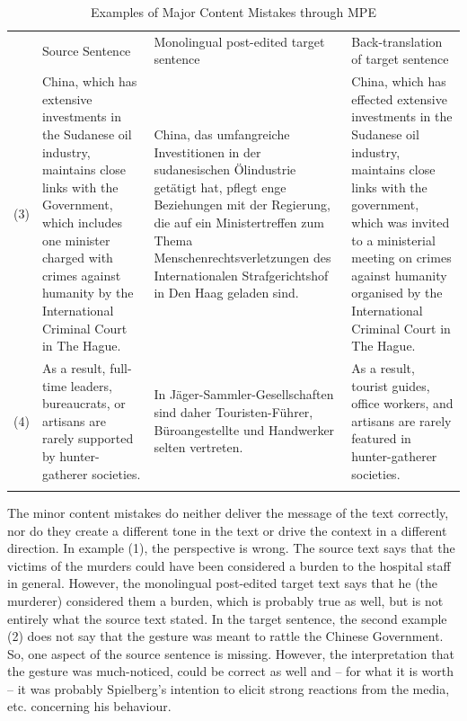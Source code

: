 \documentclass[output=paper]{langsci/langscibook}
\begin{document}
\begin{table}
\begin{tabularx}{\textwidth}{lXXX} 
    & Source Sentence & Monolingual post-edited target sentence & Back-translation of target sentence \\
\lsptoprule
(3) & China, which has extensive investments in the Sudanese oil industry, maintains close links with the Government, which includes one minister charged with crimes against humanity by the International Criminal Court in The Hague. & China, das umfangreiche Investitionen in der sudanesischen Ölindustrie getätigt hat, pflegt enge Beziehungen mit der Regierung, die auf ein Ministertreffen zum Thema Menschenrechtsverletzungen des Internationalen Strafgerichtshof in Den Haag geladen sind. & China, which has effected extensive investments in the Sudanese oil industry, maintains close links with the government, which was invited to a ministerial meeting on crimes against humanity organised by the International Criminal Court in The Hague.\\
(4) & As a result, full-time leaders, bureaucrats, or artisans are rarely supported by hunter-gatherer societies. & In Jäger-Sammler-Gesellschaften sind daher Touristen-Führer, Büroangestellte und Handwerker selten vertreten. & As a result, tourist guides, office workers, and artisans are rarely featured in hunter-gatherer societies.\\
\lspbottomrule
\end{tabularx}
\caption{Examples of Major Content Mistakes through MPE}
\label{tab:nitzke:1b}
\end{table}

The minor content mistakes do neither deliver the message of the text correctly, nor do they create a different tone in the text or drive the context in a different direction. In example (1), the perspective is wrong. The source text says that the victims of the murders could have been considered a burden to the hospital staff in general. However, the monolingual post-edited target text says that he (the murderer) considered them a burden, which is probably true as well, but is not entirely what the source text stated. In the target sentence, the second example (2) does not say that the gesture was meant to rattle the Chinese Government. So, one aspect of the source sentence is missing. However, the interpretation that the gesture was much-noticed, could be correct as well and – for what it is worth – it was probably Spielberg's intention to elicit strong reactions from the media, etc. concerning his behaviour.
\end{document}
